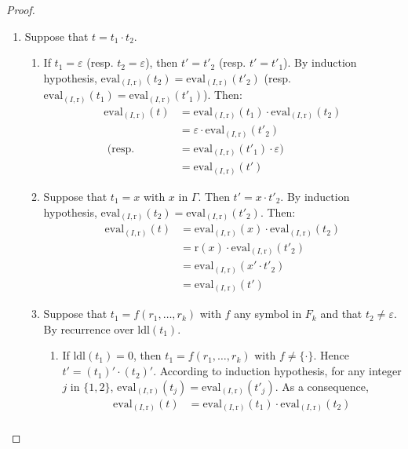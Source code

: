 \documentclass[a4paper]{llncs}
\begin{document}
\begin{proof}
\begin{enumerate}
    \item Suppose that $t=t_1\cdot t_2$.     
    \begin{enumerate}
      \item If $t_1=\varepsilon$ (resp. $t_2=\varepsilon$), then $t'=t'_2$ (resp. $t'=t'_1$). By induction hypothesis, $\mathrm{eval}_{(I,\mathrm{r})}(t_2)=\mathrm{eval}_{(I,\mathrm{r})}(t'_2)$ (resp. $\mathrm{eval}_{(I,\mathrm{r})}(t_1)=\mathrm{eval}_{(I,\mathrm{r})}(t'_1)$). Then:
        \begin{align*}
          \mathrm{eval}_{(I,\mathrm{r})}(t) &=\mathrm{eval}_{(I,\mathrm{r})}(t_1)\cdot \mathrm{eval}_{(I,\mathrm{r})}(t_2)\\
          & =\varepsilon \cdot \mathrm{eval}_{(I,\mathrm{r})}(t'_2)\\
          \text{ (resp.} & =\mathrm{eval}_{(I,\mathrm{r})}(t'_1) \cdot \varepsilon)\\
          &= \mathrm{eval}_{(I,\mathrm{r})}(t')
        \end{align*}     
    \item  Suppose that $t_1=x$ with $x$ in $\Gamma$. Then $t'=x\cdot t'_2$. By induction hypothesis, $\mathrm{eval}_{(I,\mathrm{r})}(t_2)=\mathrm{eval}_{(I,\mathrm{r})}(t'_2)$. Then:
        \begin{align*}
          \mathrm{eval}_{(I,\mathrm{r})}(t)&=\mathrm{eval}_{(I,\mathrm{r})}(x)\cdot \mathrm{eval}_{(I,\mathrm{r})}(t_2)\\
          &=\mathrm{r}(x) \cdot \mathrm{eval}_{(I,\mathrm{r})}(t'_2)\\
          & =\mathrm{eval}_{(I,\mathrm{r})}(x'\cdot t'_2)\\
          &=\mathrm{eval}_{(I,\mathrm{r})}(t')
        \end{align*}    
    \item  Suppose that $t_1=f(r_1,\ldots,r_k)$ with $f$ any symbol in $F_k$ and that $t_2\neq\varepsilon$. By recurrence over $\mathrm{ldl}(t_1)$. 
    \begin{enumerate}
      \item  If $\mathrm{ldl}(t_1)=0$, then $t_1=f(r_1,\ldots,r_k)$ with $f\neq\{\cdot\}$. Hence $t'=(t_1)'\cdot(t_2)'$.
     According to induction hypothesis, for any integer $j$ in $\{1,2\}$, $\mathrm{eval}_{(I,\mathrm{r})}(t_j)=\mathrm{eval}_{(I,\mathrm{r})}(t'_j)$.
     As a consequence, 
        \begin{align*}
          \mathrm{eval}_{(I,\mathrm{r})}(t) &=\mathrm{eval}_{(I,\mathrm{r})}(t_1)\cdot \mathrm{eval}_{(I,\mathrm{r})}(t_2)\\

\end{align*}
\end{enumerate}
\end{enumerate}
\end{enumerate}
\end{proof}
\end{document}
